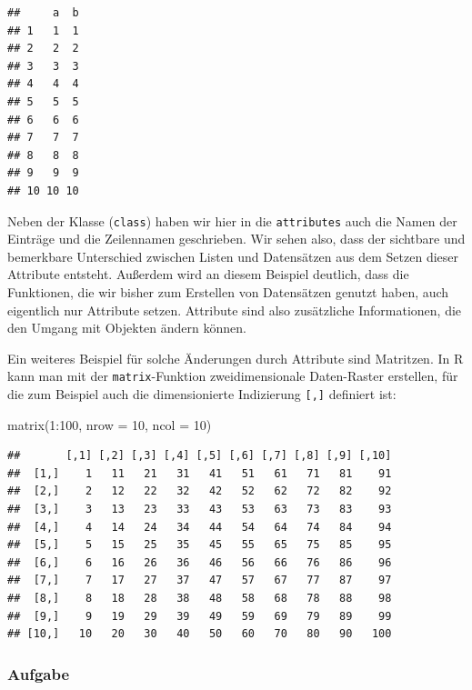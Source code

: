 \documentclass[
]{book}
\newenvironment{Shaded}{\begin{snugshade}}{\end{snugshade}}
\newcommand{\AttributeTok}[1]{\textcolor[rgb]{0.77,0.63,0.00}{#1}}
\newcommand{\DecValTok}[1]{\textcolor[rgb]{0.00,0.00,0.81}{#1}}
\newcommand{\FunctionTok}[1]{\textcolor[rgb]{0.00,0.00,0.00}{#1}}
\newcommand{\NormalTok}[1]{#1}
\newcommand{\SpecialCharTok}[1]{\textcolor[rgb]{0.00,0.00,0.00}{#1}}
\begin{document}
\begin{verbatim}
##     a  b
## 1   1  1
## 2   2  2
## 3   3  3
## 4   4  4
## 5   5  5
## 6   6  6
## 7   7  7
## 8   8  8
## 9   9  9
## 10 10 10
\end{verbatim}

Neben der Klasse (\texttt{class}) haben wir hier in die \texttt{attributes} auch die Namen der Einträge und die Zeilennamen geschrieben. Wir sehen also, dass der sichtbare und bemerkbare Unterschied zwischen Listen und Datensätzen aus dem Setzen dieser Attribute entsteht. Außerdem wird an diesem Beispiel deutlich, dass die Funktionen, die wir bisher zum Erstellen von Datensätzen genutzt haben, auch eigentlich nur Attribute setzen.
Attribute sind also zusätzliche Informationen, die den Umgang mit Objekten ändern können.

Ein weiteres Beispiel für solche Änderungen durch Attribute sind Matritzen. In R kann man mit der \texttt{matrix}-Funktion zweidimensionale Daten-Raster erstellen, für die zum Beispiel auch die dimensionierte Indizierung \texttt{{[},{]}} definiert ist:

\begin{Shaded}
\begin{Highlighting}[]
\FunctionTok{matrix}\NormalTok{(}\DecValTok{1}\SpecialCharTok{:}\DecValTok{100}\NormalTok{,}
       \AttributeTok{nrow =} \DecValTok{10}\NormalTok{, }
       \AttributeTok{ncol =} \DecValTok{10}\NormalTok{)}
\end{Highlighting}
\end{Shaded}

\begin{verbatim}
##       [,1] [,2] [,3] [,4] [,5] [,6] [,7] [,8] [,9] [,10]
##  [1,]    1   11   21   31   41   51   61   71   81    91
##  [2,]    2   12   22   32   42   52   62   72   82    92
##  [3,]    3   13   23   33   43   53   63   73   83    93
##  [4,]    4   14   24   34   44   54   64   74   84    94
##  [5,]    5   15   25   35   45   55   65   75   85    95
##  [6,]    6   16   26   36   46   56   66   76   86    96
##  [7,]    7   17   27   37   47   57   67   77   87    97
##  [8,]    8   18   28   38   48   58   68   78   88    98
##  [9,]    9   19   29   39   49   59   69   79   89    99
## [10,]   10   20   30   40   50   60   70   80   90   100
\end{verbatim}

\hypertarget{aufgabe-8}{%
\subsubsection{Aufgabe}\label{aufgabe-8}}
\end{document}
